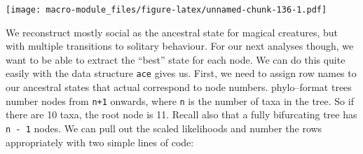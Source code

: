 \documentclass[]{book}
\newenvironment{Shaded}{\begin{snugshade}}{\end{snugshade}}
\newcommand{\KeywordTok}[1]{\textcolor[rgb]{0.13,0.29,0.53}{\textbf{{#1}}}}
\newcommand{\DataTypeTok}[1]{\textcolor[rgb]{0.13,0.29,0.53}{{#1}}}
\newcommand{\DecValTok}[1]{\textcolor[rgb]{0.00,0.00,0.81}{{#1}}}
\newcommand{\FloatTok}[1]{\textcolor[rgb]{0.00,0.00,0.81}{{#1}}}
\newcommand{\StringTok}[1]{\textcolor[rgb]{0.31,0.60,0.02}{{#1}}}
\newcommand{\NormalTok}[1]{{#1}}
\begin{document}
\begin{Shaded}
\end{Shaded}

\texttt{[image: macro-module\_files/figure-latex/unnamed-chunk-136-1.pdf]}

We reconstruct mostly social as the ancestral state for magical
creatures, but with multiple transitions to solitary behaviour. For our
next analyses though, we want to be able to extract the ``best'' state
for each node. We can do this quite easily with the data structure
\texttt{ace} gives us. First, we need to assign row names to our
ancestral states that actual correspond to node numbers. phylo--format
trees number nodes from \texttt{n+1} onwards, where \texttt{n} is the
number of taxa in the tree. So if there are 10 taxa, the root node is
11. Recall also that a fully bifurcating tree has \texttt{n\ -\ 1}
nodes. We can pull out the scaled likelihoods and number the rows
appropriately with two simple lines of code:

\begin{Shaded}
\end{Shaded}
\end{document}
